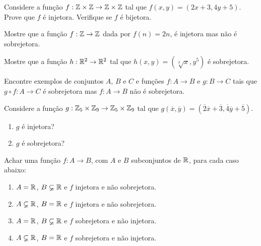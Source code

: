 \documentclass[12pt]{exam}
\begin{document}
    \vspace{.3cm}

    \questao{} Considere a fun{\c c}{\~a}o $f : \mathbb{Z} \times \mathbb{Z} \to \mathbb{Z} \times \mathbb{Z}$ tal que $f(x,y) = (2x + 3, 4y + 5)$. Prove que $f$ {\'e} injetora. Verifique se $f$ {\'e} bijetora.

    \vspace{.3cm}

    \questao{} Mostre que a fun\c{c}\~ao $f : \mathbb{Z} \to \mathbb{Z}$ dada por $f(n) = 2n$, \'e injetora mas n\~ao \'e sobrejetora.

    \vspace{.3cm}

    \questao{} Mostre que a fun\c{c}\~ao $h : \mathbb{R}^2 \to \mathbb{R}^2$ tal que $h(x, y) = (\sqrt[3]{x}, y^5)$ \'e sobrejetora.

    \vspace{.3cm}

    \questao{} Encontre exemplos de conjuntos $A$, $B$ e $C$ e funções $f : A \to B$ e $g : B \to C$ tais que $g \circ f : A \to C$ é sobrejetora mas $f : A \to B$ não é sobrejetora.

    \vspace{.3cm}

    \questao{} Considere a fun{\c c}{\~a}o $g : \mathbb{Z}_5 \times \mathbb{Z}_9 \to \mathbb{Z}_5 \times \mathbb{Z}_9$ tal que $g(\overline{x},\overline{y}) = (\overline{2} \overline{x} + \overline{3}, \overline{4}\overline{y} + \overline{5})$.
    \begin{enumerate}[label={\alph*})]
        \item $g$ \'e injetora?

        \item $g$ \'e sobrejetora?
    \end{enumerate}

    \vspace{.3cm}

    \questao{} Achar uma fun{\c c}{\~a}o $f : A \to B$, com $A$ e $B$ subconjuntos de $\mathbb{R}$, para cada caso abaixo:
    \begin{enumerate}[label={\alph*})]
        \item $A = \mathbb{R}$, $B \varsubsetneq \mathbb{R}$ e $f$ injetora e n{\~a}o sobrejetora.

        \item $A \varsubsetneq \mathbb{R}$, $B = \mathbb{R}$ e $f$ injetora e n{\~a}o sobrejetora.

        \item $A = \mathbb{R}$, $B \varsubsetneq \mathbb{R}$ e $f$ sobrejetora e n{\~a}o injetora.

        \item $A \varsubsetneq \mathbb{R}$, $B = \mathbb{R}$ e $f$ sobrejetora e n{\~a}o injetora.
    \end{enumerate}
\end{document}
